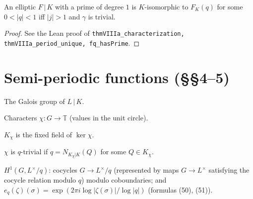 \begin{theorem}
\label{thm:VIIIa}
\leanok
An elliptic $F\,|\,K$ with a prime of degree $1$ is $K$-isomorphic to $F_K(q)$ for some $0<|q|<1$ iff $|j|>1$ and $\gamma$ is trivial.
\end{theorem}
\begin{proof}
\leanok
See the Lean proof of \texttt{thmVIIIa\_characterization, thmVIIIa\_period\_unique, fq\_hasPrime}.
\end{proof}

\section{Semi-periodic functions (\S\S 4--5)}

\begin{definition}
\label{def:galois-group}
\leanok
The Galois group of $L\,|\,K$.
\end{definition}

\begin{definition}[Characters of $G$]
\label{def:characters}
\leanok
Characters $\chi:G\to\mathbb{T}$ (values in the unit circle).
\end{definition}

\begin{definition}
\label{def:K-chi}
\leanok
$K_\chi$ is the fixed field of $\ker\chi$.
\end{definition}

\begin{definition}
\label{def:q-trivial}
\leanok
$\chi$ is $q$-trivial if $q=N_{K_\chi|K}(Q)$ for some $Q\in K_\chi$.
\end{definition}

\begin{definition}[$H^1(G,L^\times/q)$]
\label{def:H1-Lq}
\leanok
$H^1(G,L^\times/q)$: cocycles $G\to L^\times/q$ (represented by maps $G\to L^\times$ satisfying the cocycle relation modulo $q$) modulo coboundaries; and $e_q(\zeta)(\sigma)=\exp(2\pi i\log|\zeta(\sigma)|/\log|q|)$ (formulas (50), (51)).
\end{definition}

